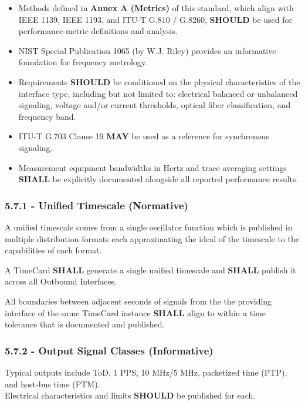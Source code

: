 \documentclass[
]{article}
\begin{document}
\begin{itemize}
\item
  Methods defined in \textbf{Annex A (Metrics)} of this standard, which
  align with IEEE 1139, IEEE 1193, and ITU-T G.810 / G.8260,
  \textbf{SHOULD} be used for performance-metric definitions and
  analysis.
\item
  NIST Special Publication 1065 (by W.J. Riley) provides an informative
  foundation for frequency metrology.
\item
  Requirements \textbf{SHOULD} be conditioned on the physical
  characteristics of the interface type, including but not limited to:
  electrical balanced or unbalanced signaling, voltage and/or current
  thresholds, optical fiber classification, and frequency band.
\item
  ITU-T G.703 Clause 19 \textbf{MAY} be used as a reference for
  synchronous signaling.
\item
  Measurement equipment bandwidths in Hertz and trace averaging settings
  \textbf{SHALL} be explicitly documented alongside all reported
  performance results.
\end{itemize}

\subsubsection{5.7.1 - Unified Timescale
(Normative)}\label{unified-timescale-normative}

A unified timescale comes from a single oscillator function which is
published in multiple distribution formats each approximating the ideal
of the timescale to the capabilities of each format.

A TimeCard \textbf{SHALL} generate a single unified timescale and
\textbf{SHALL} publish it across all Outbound Interfaces.

All boundaries between adjacent seconds of signals from the the
providing interface of the same TimeCard instance \textbf{SHALL} align
to within a time tolerance that is documented and published.

\subsubsection{5.7.2 - Output Signal Classes
(Informative)}\label{output-signal-classes-informative}

Typical outputs include ToD, 1 PPS, 10 MHz/5 MHz, packetized time (PTP),
and host-bus time (PTM).\\
Electrical characteristics and limits \textbf{SHOULD} be published for
each.
\end{document}
